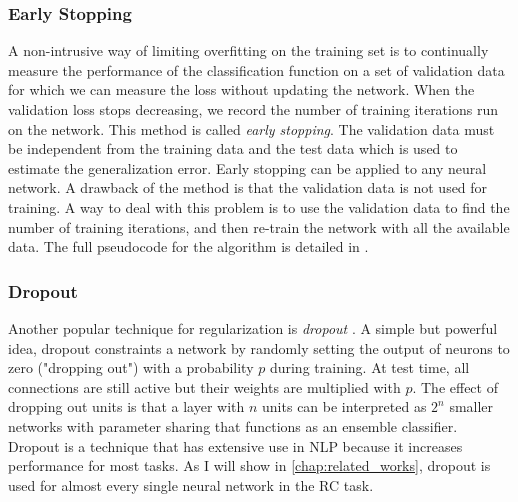 \subsubsection{Early Stopping}

A non-intrusive way of limiting overfitting on the training set is to continually measure the performance of the classification function on a set of validation data for which we can measure the loss without updating the network. When the validation loss stops decreasing, we record the number of training iterations run on the network. This method is called \emph{early stopping}. The validation data must be independent from the training data and the test data which is used to estimate the generalization error. Early stopping can be applied to any neural network. A drawback of the method is that the validation data is not used for training. A way to deal with this problem is to use the validation data to find the number of training iterations, and then re-train the network with all the available data. The full pseudocode for the algorithm is detailed in \citep[p. 242]{dl_book}. 

\subsubsection{Dropout}

Another popular technique for regularization is \emph{dropout} \cite{dropout}. A simple but powerful idea, dropout constraints a network by randomly setting the output of neurons to zero ("dropping out") with a probability $p$ during training. At test time, all connections are still active but their weights are multiplied with $p$. The effect of dropping out units is that a layer with $n$ units can be interpreted as $2^n$ smaller networks with parameter sharing that functions as an ensemble classifier. Dropout is a technique that has extensive use in NLP because it increases performance for most tasks. As I will show in \autoref{chap:related_works}, dropout is used for almost every single neural network in the RC task.



